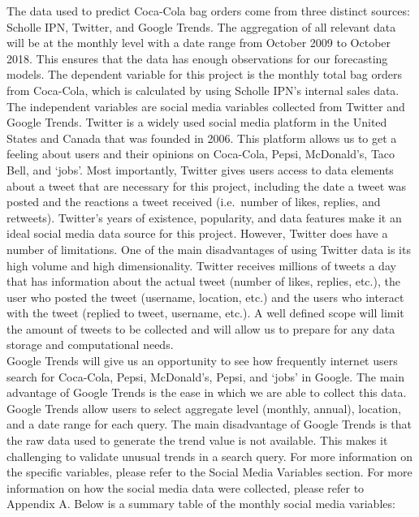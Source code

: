\documentclass[12pt,oneside]{chicagocapstone}
\begin{document}
The data used to predict Coca-Cola bag orders come from three distinct sources: Scholle IPN, Twitter, and Google Trends. The aggregation of all relevant data will be at the monthly level with a date range from October 2009 to October 2018. This ensures that the data has enough observations for our forecasting models. The dependent variable for this project is the monthly total bag orders from Coca-Cola, which is calculated by using Scholle IPN's internal sales data. The independent variables are social media variables collected from Twitter and Google Trends.
Twitter is a widely used social media platform in the United States and Canada that was founded in 2006. This platform allows us to get a feeling about users and their opinions on Coca-Cola, Pepsi, McDonald's, Taco Bell, and `jobs'. Most importantly, Twitter gives users access to data elements about a tweet that are necessary for this project, including the date a tweet was posted and the reactions a tweet received (i.e.~number of likes, replies, and retweets). Twitter's years of existence, popularity, and data features make it an ideal social media data source for this project. However, Twitter does have a number of limitations. One of the main disadvantages of using Twitter data is its high volume and high dimensionality. Twitter receives millions of tweets a day that has information about the actual tweet (number of likes, replies, etc.), the user who posted the tweet (username, location, etc.) and the users who interact with the tweet (replied to tweet, username, etc.). A well defined scope will limit the amount of tweets to be collected and will allow us to prepare for any data storage and computational needs.\\
Google Trends will give us an opportunity to see how frequently internet users search for Coca-Cola, Pepsi, McDonald's, Pepsi, and `jobs' in Google. The main advantage of Google Trends is the ease in which we are able to collect this data. Google Trends allow users to select aggregate level (monthly, annual), location, and a date range for each query. The main disadvantage of Google Trends is that the raw data used to generate the trend value is not available. This makes it challenging to validate unusual trends in a search query.
For more information on the specific variables, please refer to the Social Media Variables section. For more information on how the social media data were collected, please refer to Appendix A. Below is a summary table of the monthly social media variables:
\end{document}
